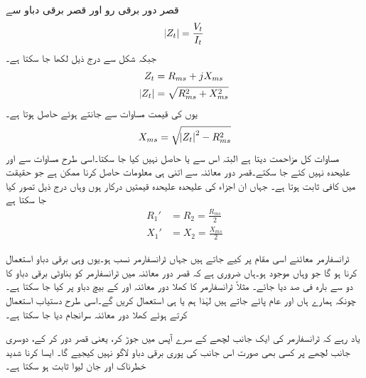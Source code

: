 قصر دور برقی رو اور قصر برقی دباو سے 
\begin{align*}
\abs{Z_t}=\frac{V_t}{I_t}
\end{align*}
جبکہ  شکل  سے  درج ذیل لکھا جا سکتا ہے۔
\begin{align*}
Z_t&=R_{ms}+j X_{ms}\\
\abs{Z_t}&=\sqrt{R_{ms}^2+X_{ms}^2}
\end{align*}
یوں  کی قیمت مساوات  سے  جانتے ہوئے  حاصل ہوتا ہے۔
\begin{align}\label{مساوات_ٹرانسفارمر_کسر_دور_امالہ_حاصل}
X_{ms}=\sqrt{\abs{Z_t}^2-R_{ms}^2}
\end{align}
مساوات  کل مزاحمت دیتا ہے البتہ اس سے  یا  حاصل نہیں کیا جا سکتا۔اسی طرح مساوات  سے  اور  علیحدہ نہیں کئے جا سکتے۔قصر دور معائنہ سے اتنی ہی معلومات حاصل کرنا ممکن ہے جو حقیقت  میں کافی ثابت ہوتا ہے۔ جہاں ان اجزاء کی علیحدہ علیحدہ قیمتیں درکار ہوں وہاں درج ذیل تصور کیا جا سکتا ہے
\begin{align*}
R_1'&=R_2=\frac{R_{ms}}{2}\\
X_1'&=X_2=\frac{X_{ms}}{2}
\end{align*}


ٹرانسفارمر معائنے  اسی مقام پر کیے جاتے ہیں جہاں ٹرانسفارمر نسب ہو۔یوں وہی  برقی دباو استعمال کرنا ہو گا جو وہاں موجود ہو۔ہاں  ضروری ہے کہ  قصر دور معائنہ میں  ٹرانسفارمر کو   بناوٹی   برقی دباو کا دو سے بارہ  فی صد دیا جائے۔ مثلاً   ٹرانسفارمر کا کھلا دور معائنہ   اور   کے بیچ  دباو پر کیا جا سکتا ہے۔ چونکہ ہمارے ہاں   اور   عام پائے جاتے ہیں لہٰذا ہم   یا   ہی استعمال کریں گے۔اسی طرح دستیاب  استعمال کرتے ہوئے کھلا دور معائنہ سرانجام دیا جا سکتا ہے۔

یاد رہے کہ ٹرانسفارمر کی ایک جانب لچھے کے سرے آپس میں جوڑ کر، یعنی  قصر دور کر کے، دوسری جانب لچھے پر کسی بھی صورت اس جانب کی پوری برقی دباو لاگو نہیں کیجیے گا۔ ایسا کرنا  شدید  خطرناک اور جان لیوا ثابت ہو سکتا ہے۔


